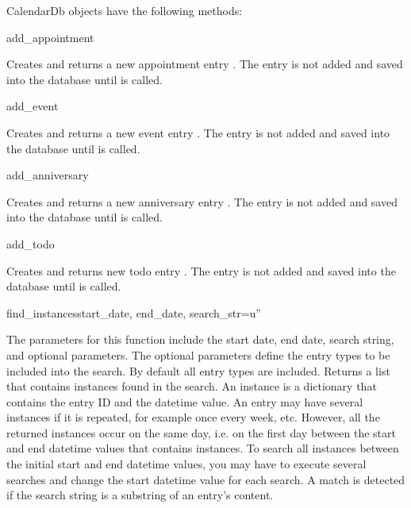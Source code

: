 \begin{classdesc*}{CalendarDb}
 objects have the following methods:

\begin{methoddesc}[CalendarDb]{add_appointment}{}

Creates and returns a new appointment entry . The 
entry is not added and saved into the database until  is 
called.

\end{methoddesc}

\begin{methoddesc}[CalendarDb]{add_event}{}

Creates and returns a new event entry . The entry is not added 
and saved into the database until  is called.

\end{methoddesc}

\begin{methoddesc}[CalendarDb]{add_anniversary}{}

Creates and returns a new anniversary entry . The entry 
is not added and saved into the database until  is called.

\end{methoddesc}

\begin{methoddesc}[CalendarDb]{add_todo}{}

Creates and returns new todo entry . The entry is not added and 
saved into the database until  is called.

\end{methoddesc}

\begin{methoddesc}[CalendarDb]{find_instances}{start_date, end_date, search_str=u''}

The parameters for this function include the start date, end date, search 
string, and optional parameters. The optional parameters define the entry 
types to be included into the search. By default all entry types are 
included. Returns a list that contains  instances found in the 
search. An instance is a dictionary that contains the entry ID and the 
datetime value. An entry may have several instances if it is repeated, for 
example once every week, etc. However, all the returned instances occur on 
the same day, i.e. on the first day between the start and end datetime 
values that contains instances. To search all instances between the initial 
start and end datetime values, you may have to execute several searches and 
change the start datetime value for each search. A match is detected if the 
search string is a substring of an entry's content. 


\end{methoddesc}
\end{classdesc*}

